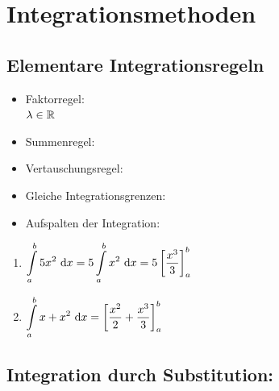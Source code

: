 \clearpage
\section{Integrationsmethoden}
\subsection{Elementare Integrationsregeln}
\begin{itemize}
	\item Faktorregel:\\
	 \qquad $\lambda\in\mathbb{R}$
	\item Summenregel:\\
	\item Vertauschungsregel:\\
	\item Gleiche Integrationsgrenzen:\\
	\item Aufspalten der Integration:\\
\end{itemize}

\Bsps
\begin{enumerate}
	\item $\displaystyle\int\limits_{a}^{b}5x^2\ \mathrm{d}x=5\displaystyle\int\limits_{a}^{b}x^2\ \mathrm{d}x=5\left[\dfrac{x^3}{3}\right]_a^b$
	\item $\displaystyle\int\limits_{a}^{b}x+x^2\ \mathrm{d}x=\left[\dfrac{x^2}{2}+\dfrac{x^3}{3}\right]_a^b$
\end{enumerate}

\clearpage
\subsection{Integration durch Substitution:}

